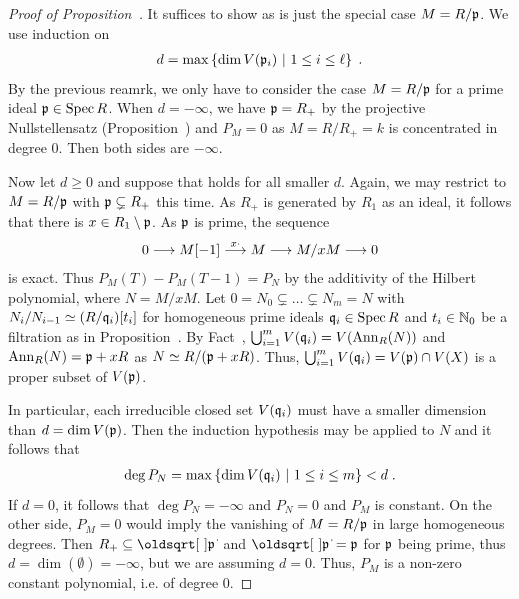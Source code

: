 \documentclass[a4paper,parskip=half,numbers=enddot, DIV=12]{scrreprt}
\begin{document}
\begin{proof}[Proof of Proposition~]
    It suffices to show   as  is just the special case $M=R/\mathfrak{p}$. We use induction on 
    \begin{align*}
	    d=\max\left\{\dim V(\mathfrak{p}_i)\ \middle|\  1\leq i\leq \ell\right\}\;.
    \end{align*}
    By the previous reamrk, we only have to consider the case $M=R/\mathfrak{p}$ for a prime ideal $\mathfrak{p}\in\operatorname{Spec} R$. When $d=-\infty$, we have $\mathfrak{p}=R_+$ by the projective Nullstellensatz (Proposition~) and $P_M=0$ as $M=R/R_+=k$ is concentrated in degree $0$. Then both sides are $-\infty$. 
    
    Now let $d\geq 0$ and suppose that  holds for all smaller $d$. Again, we may restrict to $M=R/\mathfrak{p}$ with $\mathfrak{p}\subsetneq R_+$ this time. As $R_+$ is generated by $R_1$ as an ideal, it follows that there is $x\in R_1\setminus \mathfrak{p}$. As $\mathfrak{p}$ is prime, the sequence
    \begin{align*}
        0 \morphism M[-1] \morphism[x\cdot] M \morphism M/x M \morphism 0
    \end{align*}
    is exact. Thus $P_M(T) -P_M(T-1) = P_N$ by the additivity of the Hilbert polynomial, where $N = M/xM $. Let $0 = N_0\subsetneq \ldots \subsetneq N_m = N$ with $N_i/N_{i-1} \simeq (R/\mathfrak{q}_i)[t_i]$ for homogeneous prime ideals $\mathfrak{q}_i\in \operatorname{Spec} R$  and $t_i\in \mathbb{N}_0$ be a filtration as in Proposition~. By Fact~, $\bigcup_{i=1}^m V(\mathfrak{q}_i) = V(\operatorname{Ann}_R(N))$ and $\operatorname{Ann}_R(N) = \mathfrak{p}+ xR$ as $N\simeq R/(\mathfrak{p}+xR)$. Thus, $\bigcup_{i=1}^m V(\mathfrak{q}_i) = V(\mathfrak{p})\cap V(X)$ is a proper subset of $V(\mathfrak{p})$. 
    
    In particular, each irreducible closed set $V(\mathfrak{q}_i)$ must have a smaller dimension than $d=\dim V(\mathfrak{p})$. Then the induction hypothesis may be applied to $N$ and it follows that 
    \begin{align*}
    	\deg P_N = \max\left\{\dim V(\mathfrak{q}_i)\ \middle|\  1\leq i \leq m\right\} < d\;.
    \end{align*}
    If $d=0$, it follows that $\deg P_N = -\infty$ and $P_N=0$ and $P_M$ is constant. On the other side, $P_M = 0$ would imply the vanishing of $M=R/\mathfrak{p}$ in large homogeneous degrees. Then $R_+\subseteq\sqrt{\pp}$ and $\sqrt{\pp}=\pp$ for $\mathfrak{p}$ being prime, thus $d=\dim(\emptyset)=-\infty$, but we are assuming $d=0$. Thus, $P_M$ is a non-zero constant polynomial, i.e. of degree $0$. 
    

\end{proof}
\end{document}
